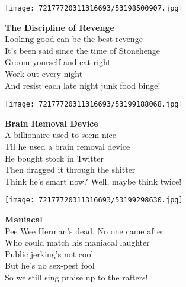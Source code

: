 \documentclass[10pt,letterpaper]{article}
\begin{document}
\begin{center}\texttt{[image: 72177720311316693/53198500907.jpg]}
\end{center}
\begin{center}
\textbf{The Discipline of Revenge}\\
\vskip 0.2in
Looking good can be the best revenge\\
It's been said since the time of Stonehenge\\
Groom yourself and eat right\\
Work out every night\\
And resist each late night junk food binge!\\
\end{center}
\pagebreak

\begin{center}
\texttt{[image: 72177720311316693/53199188068.jpg]}
\end{center}

\begin{center}
\textbf{Brain Removal Device}\\
\vskip 0.2in
A billionaire used to seem nice\\
Til he used a brain removal device\\
He bought stock in Twitter\\
Then dragged it through the shitter\\
Think he's smart now?  Well, maybe think twice!\\
\end{center}
\pagebreak

\begin{center}
\texttt{[image: 72177720311316693/53199298630.jpg]}
\end{center}

\begin{center}
\textbf{Maniacal}\\
\vskip 0.2in
Pee Wee Herman's dead.  No one came after\\
Who could match his maniacal laughter\\
Public jerking's not cool\\
But he's no sex-pest fool\\
So we still sing praise up to the rafters!\\
\end{center}
\pagebreak
\end{document}
